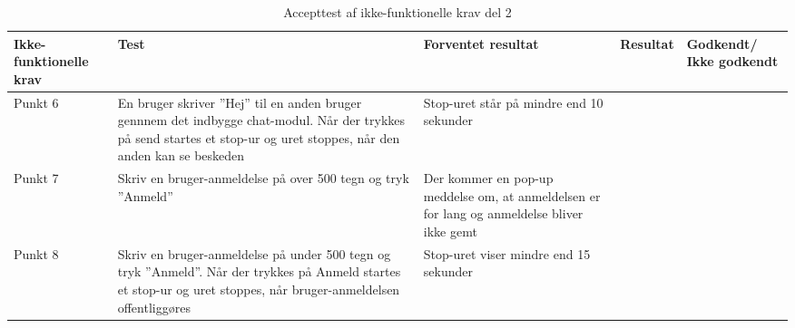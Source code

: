 	\setlength{\arrayrulewidth}{0.3mm}
	\setlength{\tabcolsep}{16pt}
	\renewcommand{\arraystretch}{1.5}
	\begin{table}[H]
		\begin{tabular}{ |p{2.3cm}|p{2.2cm}|p{2.2cm}|p{2.2cm}|p{2.2cm}| } 
			\hline
			\textbf{Ikke-funktionelle krav} & \textbf{Test} & \textbf{Forventet resultat} & \textbf{Resultat} & \textbf{Godkendt/ Ikke godkendt} \\
			\hline
		Punkt 6 & En bruger skriver ''Hej'' til en anden bruger gennnem det indbygge chat-modul. Når der trykkes på send startes et stop-ur og uret stoppes, når den anden kan se beskeden & Stop-uret står på mindre end 10 sekunder & &  \\
		\hline
		Punkt 7 & Skriv en bruger-anmeldelse på over 500 tegn og tryk ''Anmeld'' & Der kommer en pop-up meddelse om, at anmeldelsen er for lang og anmeldelse bliver ikke gemt &  & \\
		\hline
		Punkt 8 & Skriv en bruger-anmeldelse på under 500 tegn og tryk ''Anmeld''. Når der trykkes på Anmeld startes et stop-ur og uret stoppes, når bruger-anmeldelsen offentliggøres & Stop-uret viser mindre end 15 sekunder &  & \\
		\hline
	\end{tabular}
	\caption{Accepttest af ikke-funktionelle krav del 2}
	\label{table:accepttest_ifk2}
\end{table}


